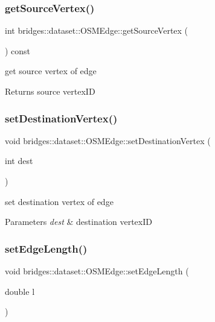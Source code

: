 \subsubsection{\texorpdfstring{get\+Source\+Vertex()}{getSourceVertex()}}
{\footnotesize\ttfamily int bridges\+::dataset\+::\+O\+S\+M\+Edge\+::get\+Source\+Vertex (\begin{DoxyParamCaption}{ }\end{DoxyParamCaption}) const\hspace{0.3cm}{\ttfamily [inline]}}

get source vertex of edge

\begin{DoxyReturn}{Returns}
source vertex\+ID 
\end{DoxyReturn}
\mbox{\label{classbridges_1_1dataset_1_1_o_s_m_edge_ab3b29d3d159aaf0784c88e375f7c218f}} 
\subsubsection{\texorpdfstring{set\+Destination\+Vertex()}{setDestinationVertex()}}
{\footnotesize\ttfamily void bridges\+::dataset\+::\+O\+S\+M\+Edge\+::set\+Destination\+Vertex (\begin{DoxyParamCaption}\item[{int}]{dest }\end{DoxyParamCaption})\hspace{0.3cm}{\ttfamily [inline]}}

set destination vertex of edge


\begin{DoxyParams}{Parameters}
{\em dest} & destination vertex\+ID \\
\hline
\end{DoxyParams}
\mbox{\label{classbridges_1_1dataset_1_1_o_s_m_edge_a469d98f2239f245b43d3475cbc8c0e74}} 
\subsubsection{\texorpdfstring{set\+Edge\+Length()}{setEdgeLength()}}
{\footnotesize\ttfamily void bridges\+::dataset\+::\+O\+S\+M\+Edge\+::set\+Edge\+Length (\begin{DoxyParamCaption}\item[{double}]{l }\end{DoxyParamCaption})\hspace{0.3cm}{\ttfamily [inline]}}

